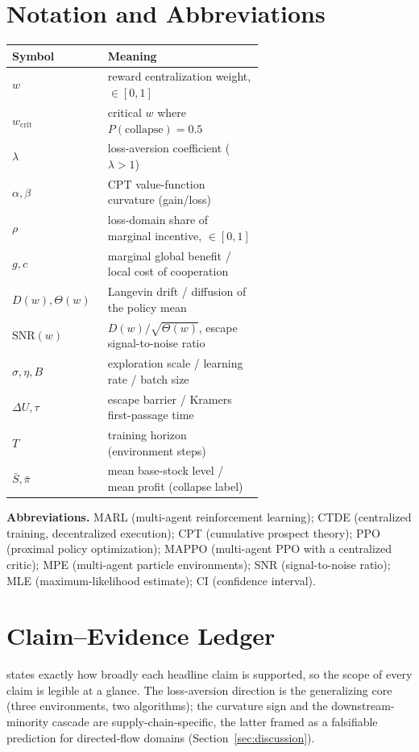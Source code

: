 \documentclass[letterpaper]{article}
\theoremstyle{plain}
\newcommand{\wcrit}{w_{\mathrm{crit}}}
\begin{document}
\section{Notation and Abbreviations}
\label{sec:appendix_notation}

\begin{table}[h]
\centering
\small
\begin{tabular}{lp{0.62\linewidth}}
\toprule
Symbol & Meaning \\
\midrule
$w$ & reward centralization weight, $\in[0,1]$ \\
$\wcrit$ & critical $w$ where $P(\mathrm{collapse}){=}0.5$ \\
$\lambda$ & loss-aversion coefficient ($\lambda{>}1$) \\
$\alpha,\beta$ & CPT value-function curvature (gain/loss) \\
$\rho$ & loss-domain share of marginal incentive, $\in[0,1]$ \\
$g,c$ & marginal global benefit / local cost of cooperation \\
$D(w),\Theta(w)$ & Langevin drift / diffusion of the policy mean \\
$\mathrm{SNR}(w)$ & $D(w)/\sqrt{\Theta(w)}$, escape signal-to-noise ratio \\
$\sigma,\eta,B$ & exploration scale / learning rate / batch size \\
$\Delta U,\tau$ & escape barrier / Kramers first-passage time \\
$T$ & training horizon (environment steps) \\
$\bar S,\bar\pi$ & mean base-stock level / mean profit (collapse label) \\
\bottomrule
\end{tabular}
\end{table}

\noindent\textbf{Abbreviations.} MARL (multi-agent reinforcement learning);
CTDE (centralized training, decentralized execution); CPT (cumulative prospect
theory); PPO (proximal policy optimization); MAPPO (multi-agent PPO with a
centralized critic); MPE (multi-agent particle environments); SNR
(signal-to-noise ratio); MLE (maximum-likelihood estimate);
CI (confidence interval).

\section{Claim--Evidence Ledger}
\label{sec:appendix_ledger}
 states exactly how broadly each headline claim is
supported, so the scope of every claim is legible at a glance. The
loss-aversion direction is the generalizing core (three environments, two
algorithms); the curvature sign and the downstream-minority cascade are
supply-chain-specific, the latter framed as a falsifiable prediction for
directed-flow domains (Section~\ref{sec:discussion}).
\end{document}
